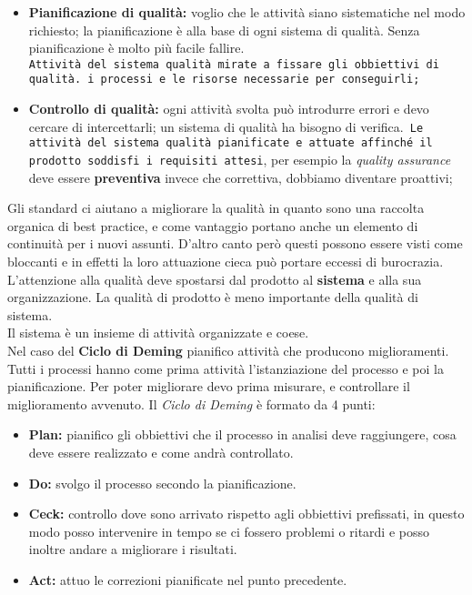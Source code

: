 \begin{itemize}

	\item \textbf{Pianificazione di qualità:} voglio che le attività siano sistematiche nel modo richiesto; la pianificazione è alla base di ogni sistema di qualità. Senza pianificazione è molto più facile fallire. \\
	\texttt{Attività del sistema qualità mirate a fissare gli obbiettivi di qualità. i processi e le risorse necessarie per conseguirli;}
	\item \textbf{Controllo di qualità:} ogni attività svolta può introdurre errori e devo cercare di intercettarli; un sistema di qualità ha bisogno di verifica.\texttt{ Le attività del sistema qualità pianificate e attuate affinché il prodotto soddisfi i requisiti attesi}, per esempio la \textit{quality assurance} deve essere \textbf{preventiva} invece che correttiva, dobbiamo diventare proattivi;
\end{itemize}
Gli standard ci aiutano a migliorare la qualità in quanto sono una raccolta organica di best practice, e come vantaggio portano anche un elemento di continuità per i nuovi assunti. D'altro canto però questi possono essere visti come bloccanti e in effetti la loro attuazione cieca può portare eccessi di burocrazia.
L'attenzione alla qualità deve spostarsi dal prodotto al \textbf{sistema} e alla sua organizzazione. La qualità di prodotto è meno importante della qualità di sistema.\\
Il sistema è un insieme di attività organizzate e coese.\\
Nel caso del \textbf{Ciclo di Deming} pianifico attività che producono miglioramenti. Tutti i processi hanno come prima attività l'istanziazione del processo e poi la pianificazione. Per poter migliorare devo prima misurare, e controllare il miglioramento avvenuto.
Il \textit{Ciclo di Deming} è formato da 4 punti:
	\begin{itemize}
		\item \textbf{Plan:} pianifico gli obbiettivi che il processo in analisi deve raggiungere, cosa deve essere realizzato e come andrà controllato.
		\item \textbf{Do:} svolgo il processo secondo la pianificazione.
		\item \textbf{Ceck:} controllo dove sono arrivato rispetto agli obbiettivi prefissati, in questo modo posso intervenire in tempo se ci fossero problemi o ritardi e posso inoltre andare a migliorare i risultati.
		\item \textbf{Act:} attuo le correzioni pianificate nel punto precedente.
	\end{itemize}

